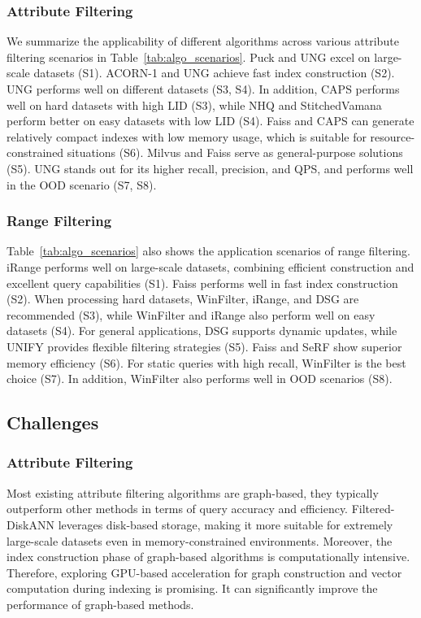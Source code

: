 \documentclass[sigconf, nonacm]{acmart}
\begin{document}
	
	\subsubsection{\textbf{Attribute Filtering}}
	We summarize the applicability of different algorithms across various attribute filtering scenarios in Table~\ref{tab:algo_scenarios}. Puck and UNG excel on large-scale datasets (S1). ACORN-1 and UNG achieve fast index construction (S2). UNG performs well on different datasets (S3, S4). In addition, CAPS performs well on hard datasets with high LID (S3), while NHQ and StitchedVamana perform better on easy datasets with low LID (S4).
	Faiss and CAPS can generate relatively compact indexes with low memory usage, which is suitable for resource-constrained situations (S6). Milvus and Faiss serve as general-purpose solutions (S5). UNG stands out for its higher recall, precision, and QPS, and performs well in the OOD scenario (S7, S8).
	\subsubsection{\textbf{Range Filtering}}
	
	Table~\ref{tab:algo_scenarios} also shows the application scenarios of range filtering. iRange performs well on large-scale datasets, combining efficient construction and excellent query capabilities (S1). Faiss performs well in fast index construction (S2). When processing hard datasets, WinFilter, iRange, and DSG are recommended (S3), while WinFilter and iRange also perform well on easy datasets (S4). For general applications, DSG supports dynamic updates, while UNIFY provides flexible filtering strategies (S5). Faiss and SeRF show superior memory efficiency (S6). For static queries with high recall, WinFilter is the best choice (S7). In addition, WinFilter also performs well in OOD scenarios (S8).
	\subsection{Challenges}
	\subsubsection{\textbf{Attribute Filtering}}
	Most existing attribute filtering algorithms are graph-based, they typically outperform other methods in terms of query accuracy and efficiency. Filtered-DiskANN leverages disk-based storage, making it more suitable for extremely large-scale datasets even in memory-constrained environments. Moreover, the index construction phase of graph-based algorithms is computationally intensive. Therefore, exploring GPU-based acceleration for graph construction and vector computation during indexing is promising. It can significantly improve the performance of graph-based methods.
	
\end{document}
